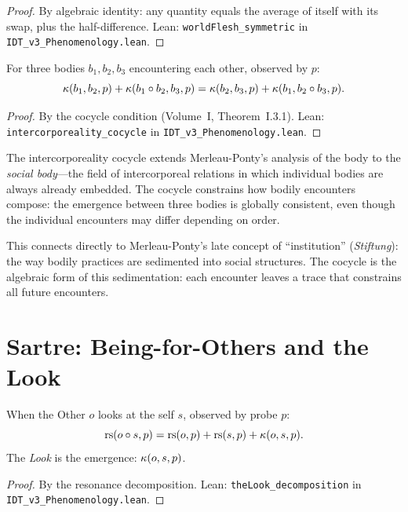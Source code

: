 \begin{proof}
By algebraic identity: any quantity equals the average of itself with its
swap, plus the half-difference.
Lean: \texttt{worldFlesh\_symmetric} in \texttt{IDT\_v3\_Phenomenology.lean}.
\end{proof}

\begin{theorem}
\label{thm:intercorporeality}
For three bodies $b_1, b_2, b_3$ encountering each other, observed by $p$:
\[
\kappa(b_1, b_2, p) + \kappa(b_1 \circ b_2, b_3, p) =
\kappa(b_2, b_3, p) + \kappa(b_1, b_2 \circ b_3, p).
\]
\end{theorem}

\begin{proof}
By the cocycle condition (Volume~I, Theorem~I.3.1).
Lean: \texttt{intercorporeality\_cocycle} in
\texttt{IDT\_v3\_Phenomenology.lean}.
\end{proof}

\begin{interpretation}
The intercorporeality cocycle extends Merleau-Ponty's analysis of the body
to the \emph{social body}---the field of intercorporeal relations in which
individual bodies are always already embedded. The cocycle constrains how
bodily encounters compose: the emergence between three bodies is globally
consistent, even though the individual encounters may differ depending on
order.

This connects directly to Merleau-Ponty's late concept of ``institution''
(\textit{Stiftung}): the way bodily practices are sedimented into social
structures. The cocycle is the algebraic form of this sedimentation: each
encounter leaves a trace that constrains all future encounters.
\end{interpretation}

\section{Sartre: Being-for-Others and the Look}

\begin{theorem}
\label{thm:the-look}
When the Other $o$ looks at the self $s$, observed by probe $p$:
\[
\mathrm{rs}(o \circ s, p) = \mathrm{rs}(o, p) + \mathrm{rs}(s, p) + \kappa(o, s, p).
\]
The \emph{Look} is the emergence: $\kappa(o, s, p)$.
\end{theorem}

\begin{proof}
By the resonance decomposition.
Lean: \texttt{theLook\_decomposition} in \texttt{IDT\_v3\_Phenomenology.lean}.
\end{proof}

